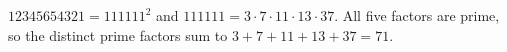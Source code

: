 $12345654321=111111^2$ and $111111=3\cdot7\cdot11\cdot13\cdot37$. All five factors are prime, so the distinct prime factors sum to $3+7+11+13+37=\boxed{71}$.
